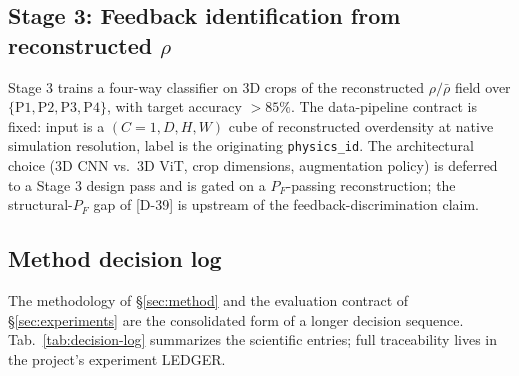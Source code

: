 \subsection{Stage 3: Feedback identification from reconstructed $\rho$}
\label{sec:suppl:nextsteps:stage3}
Stage 3 trains a four-way classifier on 3D crops of the reconstructed $\rho/\bar\rho$ field over $\{\text{P1}, \text{P2}, \text{P3}, \text{P4}\}$, with target accuracy $> 85\%$. The data-pipeline contract is fixed: input is a $(C{=}1, D, H, W)$ cube of reconstructed overdensity at native simulation resolution, label is the originating \texttt{physics\_id}. The architectural choice (3D CNN vs.\ 3D ViT, crop dimensions, augmentation policy) is deferred to a Stage 3 design pass and is gated on a $P_F$-passing reconstruction; the structural-$P_F$ gap of [D-39] is upstream of the feedback-discrimination claim.

\subsection{Method decision log}
\label{sec:suppl:nextsteps:decisions}
The methodology of \S\ref{sec:method} and the evaluation contract of \S\ref{sec:experiments} are the consolidated form of a longer decision sequence. Tab.~\ref{tab:decision-log} summarizes the scientific entries; full traceability lives in the project's experiment LEDGER.

